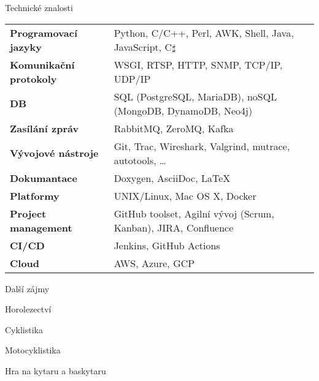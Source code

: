 \documentclass{resume} %
\begin{document}
\begin{rSection}{Technick\'{e} znalosti}

\begin{tabular}{ @{} >{\bfseries}l @{\hspace{6ex}} l }
Programovac\'{i} jazyky & Python, C/C++, Perl, AWK, Shell, Java, JavaScript, C$\sharp$ \\
Komunika\v{c}n\'{i} protokoly & WSGI, RTSP, HTTP, SNMP, TCP/IP, UDP/IP \\
DB & SQL (PostgreSQL, MariaDB), noSQL (MongoDB, DynamoDB, Neo4j) \\
Zas\'{i}l\'{a}n\'{i} zpr\'{a}v & RabbitMQ, ZeroMQ, Kafka \\
V\'{y}vojov\'{e} n\'{a}stroje & Git, Trac, Wireshark, Valgrind, mutrace, autotools, \dots \\
Dokumantace & Doxygen, AsciiDoc, \LaTeX \\
Platformy & UNIX/Linux, Mac OS X, Docker \\
Project management & GitHub toolset, Agiln\'{i} v\'{y}voj (Scrum, Kanban), JIRA, Confluence \\
CI/CD & Jenkins, GitHub Actions \\
Cloud & AWS, Azure, GCP
\end{tabular}

\end{rSection}


\begin{rSection}{Dal\v{s}\'{i} z\'{a}jmy}

\item Horolezectv\'{i}
\item Cyklistika
\item Motocyklistika
\item Hra na kytaru a baskytaru

\end{rSection}

\end{document}
